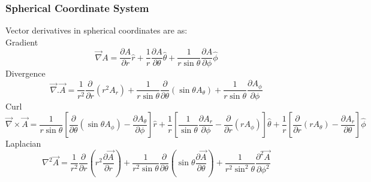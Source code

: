 \subsubsection{Spherical Coordinate System}
Vector derivatives in spherical coordinates are as:\\
Gradient\\
\begin{equation}
\vec{\nabla} A = \frac{\partial A}{\partial r}\hat{r}+\frac{1}{r}\frac{\partial A}{\partial \theta}\hat{\theta}+\frac{1}{r\sin\theta}\frac{\partial A}{\partial \phi}\hat{\phi}
\end{equation}
Divergence\\
\begin{equation}
\vec{\nabla}.\vec{A} = \frac{1}{r^2}\frac{\partial}{\partial r}(r^2A_r)+\frac{1}{r\sin\theta}\frac{\partial}{\partial\theta}(\sin\theta A_\theta)+\frac{1}{r\sin\theta}\frac{\partial A_\phi}{\partial\phi}
\end{equation}
Curl\\
\begin{equation}
\vec{\nabla}\times\vec{A} = \frac{1}{r\sin\theta}[\frac{\partial}{\partial\theta}(\sin\theta A_\phi)-\frac{\partial A_\theta}{\partial\phi}]\hat{r}+\frac{1}{r}[\frac{1}{\sin\theta}\frac{\partial A_r}{\partial\phi}-\frac{\partial}{\partial r}(rA_\phi)]\hat{\theta}+\frac{1}{r}[\frac{\partial}{\partial r}(rA_\theta)-\frac{\partial A_r}{\partial \theta}]\hat{\phi}
\end{equation}
Laplacian\\
\begin{equation}
\nabla^2 \vec{A} = \frac{1}{r^2}\frac{\partial}{\partial r}(r^2\frac{\partial\vec{A}}{\partial r})+\frac{1}{r^2\sin\theta}\frac{\partial}{\partial\theta}(\sin\theta\frac{\partial\vec{A}}{\partial \theta})+\frac{1}{r^2\sin^2\theta}\frac{\partial^2\vec{A}}{\partial \phi^2}
\end{equation}

